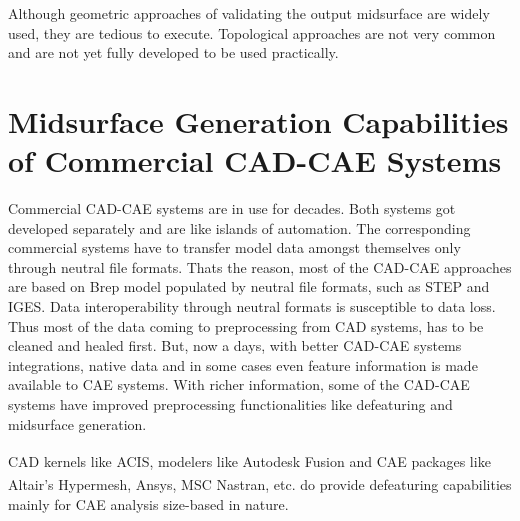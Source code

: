 
Although geometric approaches of validating the output midsurface are widely used, they are tedious to execute. Topological approaches are not very common and are not yet fully developed to be used practically. 

\section{Midsurface Generation Capabilities of Commercial CAD-CAE Systems}\label{sec:litsurvey:commercial}

Commercial CAD-CAE systems are in use for decades. Both systems got developed separately and are like islands of automation. The corresponding commercial systems have to transfer model data amongst themselves only through neutral file formats. Thats the reason, most of the CAD-CAE approaches are based on Brep model populated by neutral file formats, such as STEP and IGES.  Data interoperability through neutral formats is susceptible to data loss. Thus most of the data coming to preprocessing from CAD systems, has to be cleaned and healed first. But, now a days, with better CAD-CAE systems integrations, native data and in some cases even feature information is made available to CAE systems. With richer information, some of the CAD-CAE systems have improved preprocessing functionalities like defeaturing and midsurface generation. 

CAD kernels like ACIS\textsuperscript{\textregistered}, modelers like Autodesk Fusion\textsuperscript{\textregistered} and CAE packages like Altair's Hypermesh\textsuperscript{\textregistered}, Ansys\textsuperscript{\textregistered}, MSC Nastran\textsuperscript{\textregistered}, etc. do provide defeaturing capabilities mainly for CAE analysis size-based in nature. 

